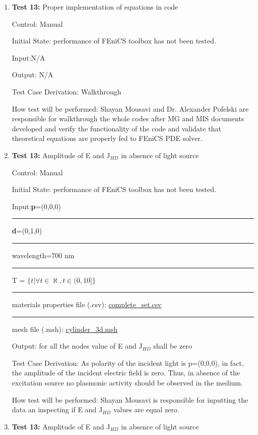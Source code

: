 \documentclass[12pt, titlepage]{article}
\begin{document}
\begin{enumerate}
	
\item{\textbf{Test 13:} Proper implementation of equations in code\\}

Control: Manual

Initial State:  performance of FEniCS toolbox has not been tested. 

Input:N/A

Output: N/A

Test Case Derivation: Walkthrough 

How test will be performed: Shayan Mousavi and Dr. Alexander Pofelski are responsible for walkthrough the whole codes after MG and MIS documents developed and verify the functionality of the code and validate that theoretical equations are properly fed to FEniCS PDE solver.

	
\item{\textbf{Test 13:} Amplitude of E and J$_{HD}$ in absence of light source\\}

Control: Manual 

Initial State:  performance of FEniCS toolbox has not been tested. 

Input:\textbf{p}=(0,0,0)\\
\rule{1.3cm}{0pt}\textbf{d}=(0,1,0)\\
\rule{1.3cm}{0pt}wavelength=700 nm\\ 
\rule{1.3cm}{0pt}T = $\{t| \forall t \in \aleph, t \in (0,10]\}$\\
\rule{1.3cm}{0pt}materials properties file (.csv): \href{https://github.com/shmouses/SPDFM/blob/master/src/TestCase/complete\_set.csv}{complete\_set.csv}\\
\rule{1.3cm}{0pt}mesh file (.msh): \href{https://github.com/shmouses/SPDFM/blob/master/src/TestCase/cylinder\_3d.msh}{cylinder\_3d.msh}

Output: for all the nodes value of E and J$_{HD}$ shall be zero 

Test Case Derivation: As polarity of the incident light is p=(0,0,0), in fact, the amplitude of the incident electric field is zero. Thus, in absence of the excitation source no plasmonic activity should be observed in the medium. 

How test will be performed: Shayan Mousavi is responsible for inputting the data an inspecting if E and J$_{HD}$ values are equal zero.  	
		
		
\item{\textbf{Test 13:} Amplitude of E and J$_{HD}$ in absence of light source\\}


\end{enumerate}
\end{document}
